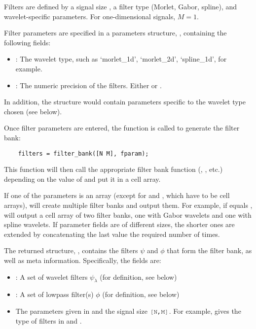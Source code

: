 \documentclass[twocolumn]{article}
\begin{document}
Filters are defined by a signal size \mcode{[N,M]}, a filter type (Morlet, Gabor, spline), and wavelet-specific parameters. For one-dimensional signals, $M = 1$.

Filter parameters are specified in a parameters structure, , containing the following fields:
\begin{itemize}
	\item {}: The wavelet type, such as `morlet\_1d', `morlet\_2d', `spline\_1d', for example.
	\item {}: The numeric precision of the filters. Either  or .
\end{itemize}
In addition, the  structure would contain parameters specific to the wavelet type chosen (see below).

Once filter parameters are entered, the  function is called
to generate the filter bank:
\begin{lstlisting}
	filters = filter_bank([N M], fparam);
\end{lstlisting}
This function will then call the appropriate filter bank function (, , etc.) depending on the value of  and put it in a cell array. 

If one of the parameters is an array (except for  and , which have to be cell arrays),  will create multiple filter banks and output them. For example, if  equals ,  will output a cell array of two filter banks, one with Gabor wavelets and one with spline wavelets. If parameter fields are of different sizes, the shorter ones are extended by concatenating the last value the required number of times.

The returned structure, , contains the filters $\psi$ and $\phi$ that form the filter bank, as well as meta information. Specifically, the fields are:
\begin{itemize}
	\item {}: A set of wavelet filters $\psi_\lambda$ (for definition, see below)
	\item {}: A set of lowpass filter(s) $\phi$ (for definition, see below)
	\item The parameters given in  and the signal size $\mcode{[N,M]}$. For example,  gives the type of filters in  and .
\end{itemize}
\end{document}
